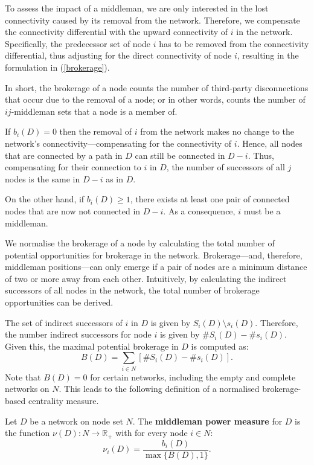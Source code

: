 To assess the impact of a middleman, we are only interested in the lost connectivity caused by its removal from the network. Therefore, we compensate the connectivity differential with the upward connectivity of $i$ in the network. Specifically, the predecessor set of node $i$ has to be removed from the connectivity differential, thus adjusting for the direct connectivity of node $i$, resulting in the formulation in (\ref{brokerage}).

In short, the brokerage of a node counts the number of third-party disconnections that occur due to the removal of a node; or in other words, counts the number of $ij$-middleman sets that a node is a member of.

If $b_{i}(D) = 0$ then the removal of $i$ from the network makes no change to the network's connectivity---compensating for the connectivity of $i$. Hence, all nodes that are connected by a path in $D$ can still be connected in $D - i$. Thus, compensating for their connection to $i$ in $D$, the number of successors of all $j$ nodes is the same in $D - i$ as in $D$.

On the other hand, if $b_{i}(D) \geqslant 1$, there exists at least one pair of connected nodes that are now not connected in $D - i$. As a consequence, $i$ must be a middleman.

\medskip\noindent
We normalise the brokerage of a node by calculating the total number of potential opportunities for brokerage in the network. Brokerage---and, therefore, middleman positions---can only emerge if a pair of nodes are a minimum distance of two or more away from each other. Intuitively, by calculating the indirect successors of all nodes in the network, the total number of brokerage opportunities can be derived.

The set of indirect successors of $i$ in $D$ is given by $S_{i}(D) \setminus s_{i}(D)$. Therefore, the number indirect successors for node $i$ is given by $\# S_{i}(D) - \# s_{i}(D)$. Given this, the maximal potential brokerage in $D$ is computed as:
\begin{equation} \label{normalisation}
B(D) = \sum_{i \in N} \left[ \# S_{i}(D) - \# s_{i}(D) \right] .
\end{equation}
Note that $B(D)=0$ for certain networks, including the empty and complete networks on $N$. This leads to the following definition of a normalised brokerage-based centrality measure.

\begin{definition} \label{middlemanpower}
Let $D$ be a network on node set $N$. The \textbf{middleman power measure} for $D$ is the function $\nu (D) \colon N \to \mathbb{R}_+$ with for every node $i \in N \colon$
\begin{equation} \label{mmpowerindex}
\nu_{i}(D) = \frac{b_{i}(D)}{ \max \{ B(D) , 1 \}} .
\end{equation}
\end{definition}

